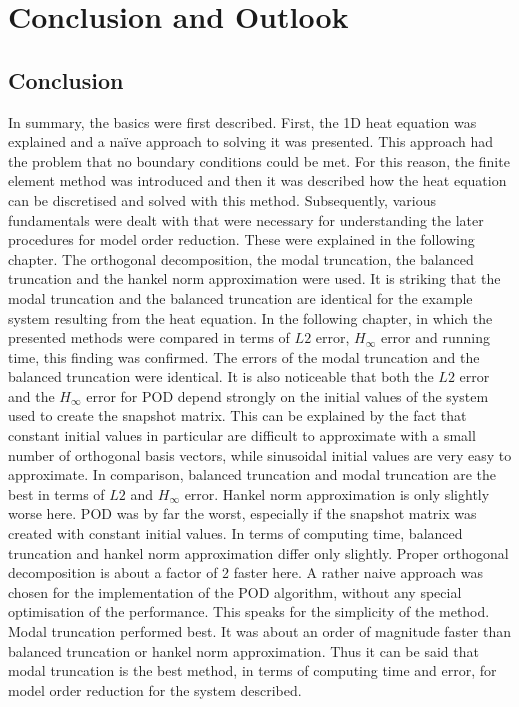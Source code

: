 \chapter{Conclusion and Outlook}
\section{Conclusion}
In summary, the basics were first described.
First, the 1D heat equation was explained and a naïve approach to solving it was presented.
This approach had the problem that no boundary conditions could be met.
For this reason, the finite element method was introduced and then it was described how the heat equation can be discretised and solved with this method.
Subsequently, various fundamentals were dealt with that were necessary for understanding the later procedures for model order reduction.
These were explained in the following chapter.
The orthogonal decomposition, the modal truncation, the balanced truncation and the hankel norm approximation were used.
It is striking that the modal truncation and the balanced truncation are identical for the example system resulting from the heat equation.
In the following chapter, in which the presented methods were compared in terms of \(L2\) error, \(H_{\infty}\) error and running time, this finding was confirmed. The errors of the modal truncation and the balanced truncation were identical.
It is also noticeable that both the \(L2\) error and the \(H_{\infty}\) error for POD depend strongly on the initial values of the system used to create the snapshot matrix.
This can be explained by the fact that constant initial values in particular are difficult to approximate with a small number of orthogonal basis vectors, while sinusoidal initial values are very easy to approximate.
In comparison, balanced truncation and modal truncation are the best in terms of \(L2\) and \(H_{\infty}\) error. 
Hankel norm approximation is only slightly worse here.
POD was by far the worst, especially if the snapshot matrix was created with constant initial values.
In terms of computing time, balanced truncation and hankel norm approximation differ only slightly. 
Proper orthogonal decomposition is about a factor of 2 faster here.
A rather naive approach was chosen for the implementation of the POD algorithm, without any special optimisation of the performance.
This speaks for the simplicity of the method.
Modal truncation performed best. 
It was about an order of magnitude faster than balanced truncation or hankel norm approximation.
Thus it can be said that modal truncation is the best method, in terms of computing time and error, for model order reduction for the system described.
   
